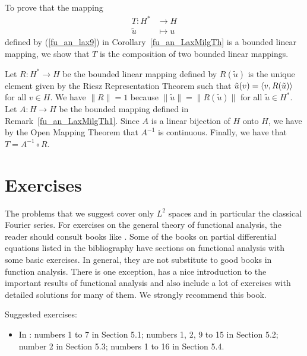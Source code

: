 \begin{rmk}
To prove that the mapping
\begin{align*}
T: H^\ast &\rightarrow H \\
\tilde{u} &\mapsto u
\end{align*}
defined by (\ref{fu_an_lax9}) in Corollary~\ref{fu_an_LaxMilgTh} is a
bounded linear mapping, we show that $T$ is the composition of two
bounded linear mappings.              \label{fu_an_LaxMilgTh2}

Let $\displaystyle R:H^\ast \rightarrow H$ be the bounded linear
mapping defined by $R(\tilde{u})$ is the unique element given by the
Riesz Representation Theorem such that
$\tilde{u}(v) = \left\langle{v} , {R(\tilde{u})}\right\rangle$ for all $v \in H$.
We have $\|R\|=1$ because $\|\tilde{u}\| = \|R(\tilde{u})\|$ for all
$\displaystyle \tilde{u}\in H^\ast$.  Let $A:H\rightarrow H$ be the
bounded mapping defined in Remark~\ref{fu_an_LaxMilgTh1}.  Since $A$
is a linear bijection of $H$ onto $H$, we have by the Open Mapping
Theorem that $\displaystyle A^{-1}$ is continuous.  Finally, we have that
$\displaystyle T=A^{-1}\circ R$.
\end{rmk}

\section{Exercises}

The problems that we suggest cover only $\displaystyle L^2$ spaces and
in particular the classical Fourier series.  For exercises on the
general theory of functional analysis, the reader should consult books like
\cite{Br,ReeSim,Ru,RuFA}.  Some of the books on
partial differential equations listed in the bibliography have
sections on functional analysis with some basic exercises.  In general,
they are not substitute to good books in function analysis.  There is one
exception, \cite{Br} has a nice introduction to the important results
of functional analysis and also include a lot of exercises with
detailed solutions for many of them.  We strongly recommend this book.

Suggested exercises:

\begin{itemize}
\item In \cite{Str}: numbers 1 to 7 in Section 5.1; numbers 1, 2, 9 to
15 in Section 5.2; number 2 in Section 5.3; numbers 1 to 16 in Section 5.4. 
\end{itemize}


